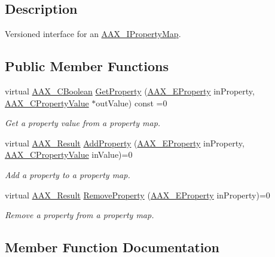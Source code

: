 \subsection{Description}
Versioned interface for an \hyperlink{a00112}{A\+A\+X\+\_\+\+I\+Property\+Map}. \subsection*{Public Member Functions}
\begin{DoxyCompactItemize}
\item 
virtual \hyperlink{a00149_aa216506530f1d19a2965931ced2b274b}{A\+A\+X\+\_\+\+C\+Boolean} \hyperlink{a00079_a64eb5a98b54452ad0c4e09b32811a4e8}{Get\+Property} (\hyperlink{a00283_a6571f4e41a5dd06e4067249228e2249e}{A\+A\+X\+\_\+\+E\+Property} in\+Property, \hyperlink{a00149_ab247c0d8686c14e05cbb567ef276f249}{A\+A\+X\+\_\+\+C\+Property\+Value} $\ast$out\+Value) const =0
\begin{DoxyCompactList}\small\item\em Get a property value from a property map. \end{DoxyCompactList}\item 
virtual \hyperlink{a00149_a4d8f69a697df7f70c3a8e9b8ee130d2f}{A\+A\+X\+\_\+\+Result} \hyperlink{a00079_ae2ef22ba98aeb1502b0115173390f12a}{Add\+Property} (\hyperlink{a00283_a6571f4e41a5dd06e4067249228e2249e}{A\+A\+X\+\_\+\+E\+Property} in\+Property, \hyperlink{a00149_ab247c0d8686c14e05cbb567ef276f249}{A\+A\+X\+\_\+\+C\+Property\+Value} in\+Value)=0
\begin{DoxyCompactList}\small\item\em Add a property to a property map. \end{DoxyCompactList}\item 
virtual \hyperlink{a00149_a4d8f69a697df7f70c3a8e9b8ee130d2f}{A\+A\+X\+\_\+\+Result} \hyperlink{a00079_a10bc1440141e74e3c62499754574f935}{Remove\+Property} (\hyperlink{a00283_a6571f4e41a5dd06e4067249228e2249e}{A\+A\+X\+\_\+\+E\+Property} in\+Property)=0
\begin{DoxyCompactList}\small\item\em Remove a property from a property map. \end{DoxyCompactList}\end{DoxyCompactItemize}


\subsection{Member Function Documentation}
\hypertarget{a00079_a64eb5a98b54452ad0c4e09b32811a4e8}{}
